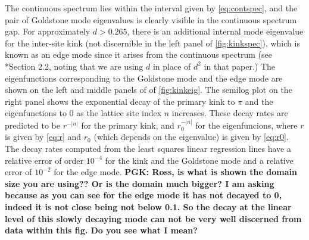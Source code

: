 \documentclass[12pt,reqno]{amsart}
\begin{document}
The continuous spectrum lies within the interval given by \cref{eq:contspec}, and the pair of Goldstone mode eigenvalues is clearly visible in the continuous spectrum gap. For approximately $d > 0.265$, there is an additional internal mode eigenvalue for the inter-site kink (not discernible in the left panel of \cref{fig:kinkspec}), which is known as an edge mode since it arises from the continuous spectrum (see \cite{KevrekidisWeinstein2000}*{Section 2.2}, noting that we are using $d$ in place of $d^2$ in that paper.) The eigenfunctions corresponding to the Goldstone mode and the edge mode are shown on the left and middle panels of of \cref{fig:kinkeig}. The semilog plot on the right panel shows the exponential decay of the primary kink to $\pi$ and the eigenfunctions to 0 as the lattice site index $n$ increases. These decay rates are predicted to be $r^{-|n|}$ for the primary kink, and $r_0^{-|n|}$ for the eigenfuncions, where $r$ is given by \cref{eq:r} and $r_0$ (which depends on the eigenvalue) is given by \cref{eq:r0}. The decay rates computed from the least squares linear regression lines have a relative error of order $10^{-4}$ for the kink and the Goldstone mode and a relative error of $10^{-2}$ for the edge mode.
{\bf PGK: Ross, is what is shown the domain
size you are using?? Or is the domain much bigger?
I am asking because as you can see for the edge mode
it has not decayed to 0, indeed it is not close being
not below 0.1. So the decay at the linear level
of this slowly decaying mode can not be very well
discerned from data within this fig. Do you see what I mean?}
\end{document}

